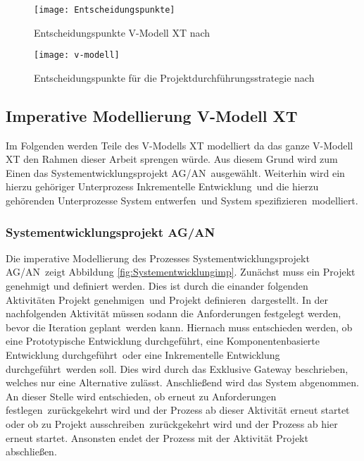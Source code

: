  
 
 \begin{figure}[!htbp]
\begin{center}
  \texttt{[image: Entscheidungspunkte]} %
  \caption{Entscheidungspunkte V-Modell XT nach \cite{2004vmodell}}
  \label{fig:entscheidungspunkte}
\end{center}
\end{figure}
 
\begin{sidewaysfigure}[!htbp]
\begin{center}
  \texttt{[image: v-modell]} %
  \caption{Entscheidungspunkte für die Projektdurchführungsstrategie nach \cite{2004vmodell}}
  \label{fig:v-modell}
\end{center}
\end{sidewaysfigure}


\clearpage

\subsection{Imperative Modellierung V-Modell XT}

Im Folgenden werden Teile des V-Modells XT modelliert da das ganze V-Modell XT den Rahmen dieser Arbeit sprengen würde. Aus diesem Grund wird zum Einen das \grqq Systementwicklungsprojekt AG/AN\grqq \ ausgewählt. Weiterhin wird ein hierzu gehöriger Unterprozess \grqq Inkrementelle Entwicklung\grqq \ und die hierzu gehörenden Unterprozesse \grqq System entwerfen\grqq \ und \grqq System spezifizieren\grqq \ modelliert.

\subsubsection{Systementwicklungsprojekt AG/AN}


Die imperative Modellierung des Prozesses \grqq Systementwicklungsprojekt AG/AN\grqq \ zeigt Abbildung \ref{fig:Systementwicklungimp}. \newline
Zunächst muss ein Projekt genehmigt und definiert werden. Dies ist durch die einander folgenden Aktivitäten \grqq Projekt genehmigen\grqq \ und \grqq Projekt definieren\grqq \ dargestellt.\newline
In der nachfolgenden Aktivität müssen sodann die \grqq Anforderungen festgelegt werden\grqq, bevor die \grqq Iteration geplant\grqq \ werden kann. \newline
Hiernach muss entschieden werden, ob eine \grqq Prototypische Entwicklung durchgeführt\grqq, eine \grqq Komponentenbasierte Entwicklung durchgeführt\grqq \ oder eine \grqq Inkrementelle Entwicklung durchgeführt\grqq \ werden soll. Dies wird durch das Exklusive Gateway beschrieben, welches nur eine Alternative zulässt.\newline
Anschließend wird das \grqq System abgenommen\grqq. An dieser Stelle wird entschieden, ob erneut zu \grqq Anforderungen festlegen\grqq \ zurückgekehrt wird und der Prozess ab dieser Aktivität erneut startet oder ob zu \grqq Projekt ausschreiben\grqq \ zurückgekehrt wird und der Prozess ab hier erneut startet. Ansonsten endet der Prozess mit der Aktivität \grqq Projekt abschließen\grqq.

